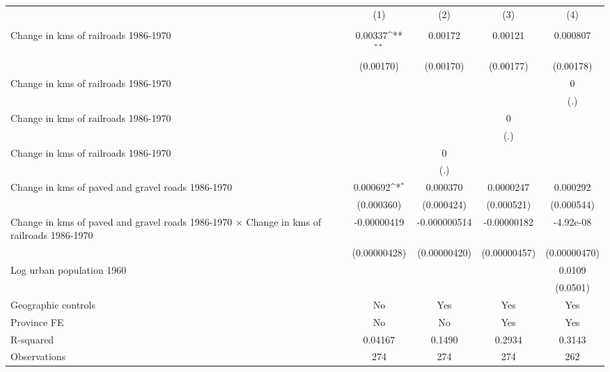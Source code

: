 {
\def\sym#1{\ifmmode^{#1}\else\(^{#1}\)\fi}
\begin{tabular}{l*{4}{c}}
\hline\hline
                &\multicolumn{1}{c}{(1)}&\multicolumn{1}{c}{(2)}&\multicolumn{1}{c}{(3)}&\multicolumn{1}{c}{(4)}\\
                &\multicolumn{1}{c}{}&\multicolumn{1}{c}{}&\multicolumn{1}{c}{}&\multicolumn{1}{c}{}\\
\hline
Change in kms of railroads 1986-1970&  0.00337\sym{**} &  0.00172         &  0.00121         & 0.000807         \\
                &(0.00170)         &(0.00170)         &(0.00177)         &(0.00178)         \\
[1em]
Change in kms of railroads 1986-1970&                  &                  &                  &        0         \\
                &                  &                  &                  &      (.)         \\
[1em]
Change in kms of railroads 1986-1970&                  &                  &        0         &                  \\
                &                  &                  &      (.)         &                  \\
[1em]
Change in kms of railroads 1986-1970&                  &        0         &                  &                  \\
                &                  &      (.)         &                  &                  \\
[1em]
Change in kms of paved and gravel roads 1986-1970& 0.000692\sym{*}  & 0.000370         &0.0000247         & 0.000292         \\
                &(0.000360)         &(0.000424)         &(0.000521)         &(0.000544)         \\
[1em]
Change in kms of paved and gravel roads 1986-1970 $\times$ Change in kms of railroads 1986-1970&-0.00000419         &-0.000000514         &-0.00000182         &-4.92e-08         \\
                &(0.00000428)         &(0.00000420)         &(0.00000457)         &(0.00000470)         \\
[1em]
Log urban population 1960&                  &                  &                  &   0.0109         \\
                &                  &                  &                  & (0.0501)         \\
\hline
Geographic controls&       No         &      Yes         &      Yes         &      Yes         \\
Province FE     &       No         &       No         &      Yes         &      Yes         \\
R-squared       &  0.04167         &   0.1490         &   0.2934         &   0.3143         \\
Observations    &      274         &      274         &      274         &      262         \\
\hline\hline
\end{tabular}
}
